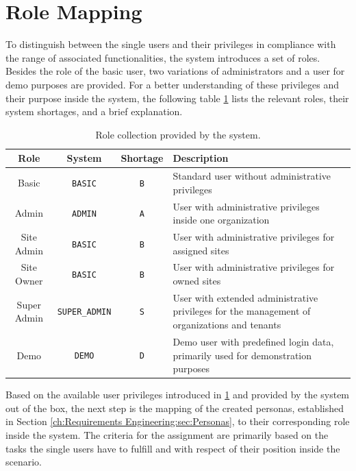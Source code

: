 \section{Role Mapping}
\label{ch:Requirements Engineering:sec:Role Mapping}

To distinguish between the single users and their privileges in compliance with the range of associated functionalities, the system introduces a set of roles. Besides the role of the basic user, two variations of administrators and a user for demo purposes are provided.
For a better understanding of these privileges and their purpose inside the system, the following table \ref{tab:system-role-collection} lists the relevant roles, their system shortages, and a brief explanation.

\begingroup
\setlength{\tabcolsep}{10pt} %
\renewcommand{\arraystretch}{1.5} %
\begin{table}[h]
    \centering
    \caption{Role collection provided by the system.}
    \begin{tabular}{c|c|c|m{6cm}}
        Role & System & Shortage & Description \\
        \hline
        Basic & \verb|BASIC| & \verb|B| & Standard user without administrative privileges \\
        Admin & \verb|ADMIN| & \verb|A| & User with administrative privileges inside one organization \\
        Site Admin & \verb|BASIC| & \verb|B| & User with administrative privileges for assigned sites \\
        Site Owner & \verb|BASIC| & \verb|B| & User with administrative privileges for owned sites \\
        Super Admin & \verb|SUPER_ADMIN| & \verb|S| & User with extended administrative privileges for the management of organizations and tenants \\
        Demo & \verb|DEMO| & \verb|D| & Demo user with predefined login data, primarily used for demonstration purposes \\
    \end{tabular}
    \label{tab:system-role-collection}
\end{table}
\endgroup

\noindent Based on the available user privileges introduced in \ref{tab:system-role-collection} and provided by the system out of the box, the next step is the mapping of the created personas, established in Section \ref{ch:Requirements Engineering:sec:Personas}, to their corresponding role inside the system.
The criteria for the assignment are primarily based on the tasks the single users have to fulfill and with respect of their position inside the scenario.

